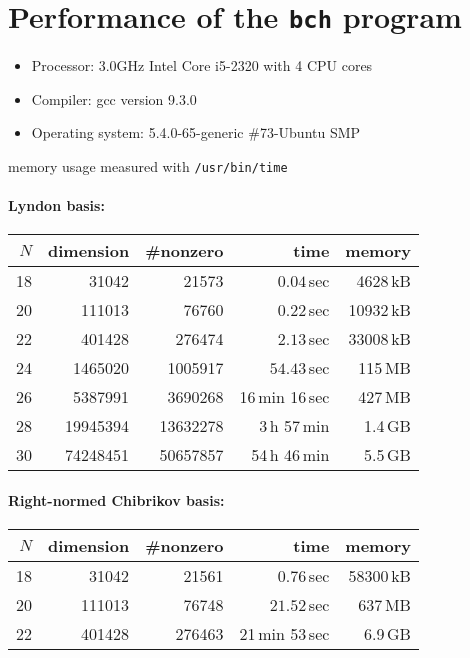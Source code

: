 \documentclass[11pt,a4paper]{article}
\begin{document}
\section{Performance of the {\tt bch} program}
\begin{itemize}
\item Processor: 3.0GHz Intel Core i5-2320 with 4 CPU cores
\item Compiler: gcc version 9.3.0
\item Operating system: 5.4.0-65-generic \#73-Ubuntu SMP
\end{itemize}

memory usage measured with \verb|/usr/bin/time|
\paragraph{Lyndon basis:}
\begin{center}
\begin{tabular}{rrrrr}
\hline
$N$ & dimension & \#nonzero & time  & memory \\
\hline
18 &  31042 & 21573 &  $0.04$\,sec & 4628\,kB\\
20 & 111013 & 76760 & $0.22$\,sec  & 10932\,kB \\
22 & 401428 & 276474 & $2.13$\,sec & 33008\,kB \\
24 & 1465020 & 1005917 & $54.43$\,sec  & 115\,MB\\
26 & 5387991 & 3690268 & 16\,min 16\,sec  &  427\,MB\\
28 & 19945394 & 13632278 & 3\,h 57\,min & 1.4\,GB\\
30 & 74248451 & 50657857 & 54\,h 46\,min & 5.5\,GB\\
\hline
\end{tabular}
\end{center}

\paragraph{Right-normed Chibrikov basis:}
\begin{center}
\begin{tabular}{rrrrr}
\hline
$N$ & dimension & \#nonzero & time  & memory \\
\hline
18 & 31042  & 21561 & $0.76$\,sec & 58300\,kB \\
20 & 111013 & 76748 & $21.52$\,sec & 637\,MB \\
22 & 401428 & 276463 & 21\,min 53\,sec & 6.9\,GB\\
\hline
\end{tabular}
\end{center}
\end{document}
